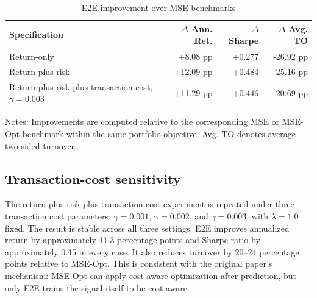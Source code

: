 \documentclass[11pt]{article}
\begin{document}
\begin{table}[H]
\centering
\caption{E2E improvement over MSE benchmarks}
\label{tab:deltas}
\begin{tabular}{lrrr}
\toprule
Specification & $\Delta$ Ann. Ret. & $\Delta$ Sharpe & $\Delta$ Avg. TO \\
\midrule
Return-only & +8.08 pp & +0.277 & -26.92 pp \\
Return-plus-risk & +12.09 pp & +0.484 & -25.16 pp \\
Return-plus-risk-plus-transaction-cost, $\gamma=0.003$ & +11.29 pp & +0.446 & -20.69 pp \\
\bottomrule
\end{tabular}
\begin{flushleft}
\small
Notes: Improvements are computed relative to the corresponding MSE or MSE-Opt benchmark within the same portfolio objective. Avg. TO denotes average two-sided turnover.
\end{flushleft}
\end{table}

\subsection{Transaction-cost sensitivity}

The return-plus-risk-plus-transaction-cost experiment is repeated under three transaction cost parameters: $\gamma=0.001$, $\gamma=0.002$, and $\gamma=0.003$, with $\lambda=1.0$ fixed. The result is stable across all three settings. E2E improves annualized return by approximately 11.3 percentage points and Sharpe ratio by approximately 0.45 in every case. It also reduces turnover by 20--24 percentage points relative to MSE-Opt. This is consistent with the original paper's mechanism: MSE-Opt can apply cost-aware optimization after prediction, but only E2E trains the signal itself to be cost-aware.
\end{document}
